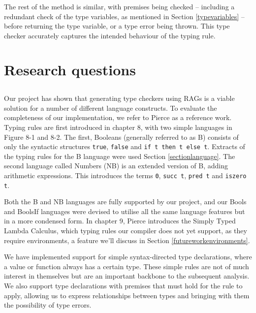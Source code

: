 \documentclass[nofilelist]{cslthse-msc}
\newcommand{\CR}[1]{\textcolor{green!60!black}{[\textbf{CR}:#1]}}
\begin{document}
The rest of the method is similar, with premises being checked -- including a redundant check of the type variables, as mentioned in Section \ref{typevariables} -- before returning the type variable, or a type error being thrown.
This type checker accurately captures the intended behaviour of the typing rule.

\section{Research questions}\label{sectionresearchquestions}

\subsection{\rqone}
Our project has shown that generating type checkers using RAGs is a viable solution for a number of different language constructs.
To evaluate the completeness of our implementation, we refer to Pierce\cite{Pierce} as a reference work.
Typing rules are first introduced in chapter 8, with two simple languages in Figure 8-1 and 8-2.
The first, Booleans (generally referred to as B) consists of only the syntactic structures \lstinline{true}, \lstinline{false} and \lstinline{if t then t else t}.
Extracts of the typing rules for the B language were used Section \ref{sectionlanguage}.
The second language called Numbers (NB) is an extended version of B, adding arithmetic expressions.
This introduces the terms \lstinline{0}, \lstinline{succ t}, \lstinline{pred t} and \lstinline{iszero t}.

Both the B and NB languages are fully supported by our project, and our Bools and BoolsIf languages were devised to utilise all the same language features but in a more condensed form.
In chapter 9, Pierce introduces the Simply Typed Lambda Calculus, which typing rules our compiler does not yet support, as they require environments, a feature we'll discuss in Section \ref{futureworkenvironments}.

We have implemented support for simple syntax-directed type declarations, where a value or function always has a certain type.
These simple rules are not of much interest in themselves but are an important backbone to the subsequent analysis.
We also support type declarations with premises that must hold for the rule to apply, allowing us to express relationships between types and bringing with them the possibility of type errors.
\end{document}
